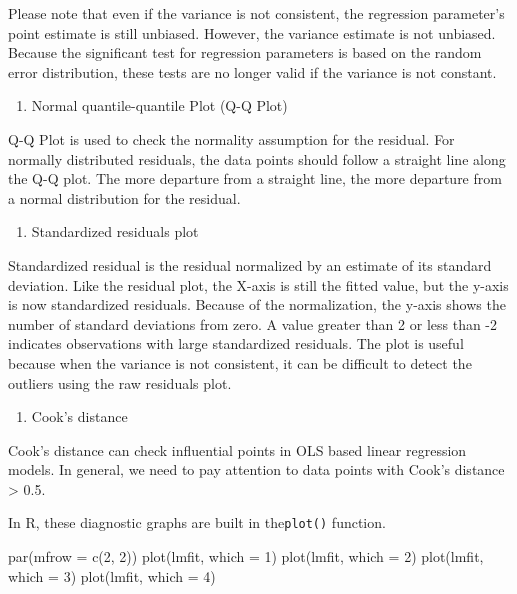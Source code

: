 \documentclass[
  12pt,
]{krantz}
\makeatletter
\newenvironment{Shaded}{\begin{snugshade}}{\end{snugshade}}
\newcommand{\AttributeTok}[1]{\textcolor[rgb]{0.61,0.61,0.61}{#1}}
\newcommand{\DecValTok}[1]{\textcolor[rgb]{0.06,0.06,0.06}{#1}}
\newcommand{\FunctionTok}[1]{\textcolor[rgb]{0,0,0}{#1}}
\newcommand{\NormalTok}[1]{#1}
\providecommand{\tightlist}{%
  \setlength{\itemsep}{0pt}\setlength{\parskip}{0pt}}
\newenvironment{kframe}{%
\medskip{}
\setlength{\fboxsep}{.8em}
 \def\at@end@of@kframe{}%
 \ifinner\ifhmode%
  \def\at@end@of@kframe{\end{minipage}}%
  \begin{minipage}{\columnwidth}%
 \fi\fi%
 \def\FrameCommand##1{\hskip\@totalleftmargin \hskip-\fboxsep
 \colorbox{shadecolor}{##1}\hskip-\fboxsep
     \hskip-\linewidth \hskip-\@totalleftmargin \hskip\columnwidth}%
 \MakeFramed {\advance\hsize-\width
   \@totalleftmargin\z@ \linewidth\hsize
   \@setminipage}}%
 {\par\unskip\endMakeFramed%
 \at@end@of@kframe}
\renewenvironment{Shaded}{\begin{kframe}}{\end{kframe}}
\makeatother
\begin{document}
Please note that even if the variance is not consistent, the regression parameter's point estimate is still unbiased. However, the variance estimate is not unbiased. Because the significant test for regression parameters is based on the random error distribution, these tests are no longer valid if the variance is not constant.

\begin{enumerate}
\def\labelenumi{(\arabic{enumi})}
\setcounter{enumi}{1}
\tightlist
\item
  Normal quantile-quantile Plot (Q-Q Plot) 
\end{enumerate}

Q-Q Plot is used to check the normality assumption for the residual. For normally distributed residuals, the data points should follow a straight line along the Q-Q plot. The more departure from a straight line, the more departure from a normal distribution for the residual.

\begin{enumerate}
\def\labelenumi{(\arabic{enumi})}
\setcounter{enumi}{2}
\tightlist
\item
  Standardized residuals plot 
\end{enumerate}

Standardized residual is the residual normalized by an estimate of its standard deviation. Like the residual plot, the X-axis is still the fitted value, but the y-axis is now standardized residuals. Because of the normalization, the y-axis shows the number of standard deviations from zero. A value greater than 2 or less than -2 indicates observations with large standardized residuals. The plot is useful because when the variance is not consistent, it can be difficult to detect the outliers using the raw residuals plot.

\begin{enumerate}
\def\labelenumi{(\arabic{enumi})}
\setcounter{enumi}{3}
\tightlist
\item
  Cook's distance 
\end{enumerate}

Cook's distance can check influential points in OLS based linear regression models. In general, we need to pay attention to data points with Cook's distance \textgreater{} 0.5.

In R, these diagnostic graphs are built in the\texttt{plot()} function.

\begin{Shaded}
\begin{Highlighting}[]
\FunctionTok{par}\NormalTok{(}\AttributeTok{mfrow =} \FunctionTok{c}\NormalTok{(}\DecValTok{2}\NormalTok{, }\DecValTok{2}\NormalTok{))}
\FunctionTok{plot}\NormalTok{(lmfit, }\AttributeTok{which =} \DecValTok{1}\NormalTok{)}
\FunctionTok{plot}\NormalTok{(lmfit, }\AttributeTok{which =} \DecValTok{2}\NormalTok{)}
\FunctionTok{plot}\NormalTok{(lmfit, }\AttributeTok{which =} \DecValTok{3}\NormalTok{)}
\FunctionTok{plot}\NormalTok{(lmfit, }\AttributeTok{which =} \DecValTok{4}\NormalTok{)}
\end{Highlighting}
\end{Shaded}
\end{document}
